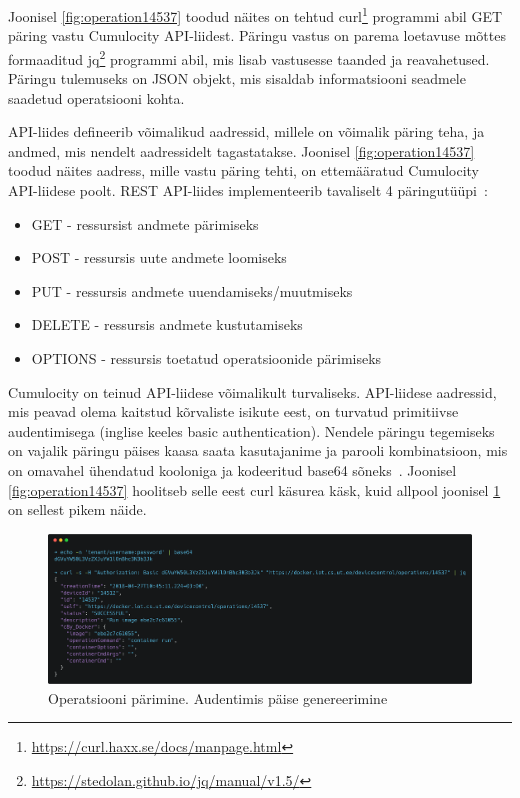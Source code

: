 \documentclass[12pt]{article}
\begin{document}
  \FloatBarrier

  Joonisel \ref{fig:operation14537} toodud näites on tehtud curl\footnote{\url{https://curl.haxx.se/docs/manpage.html}}
  programmi abil GET päring vastu Cumulocity API-liidest.
  Päringu vastus on parema loetavuse mõttes formaaditud jq\footnote{\url{https://stedolan.github.io/jq/manual/v1.5/}}
  programmi abil, mis lisab vastusesse
  taanded ja reavahetused. Päringu tulemuseks on JSON objekt, mis sisaldab informatsiooni seadmele saadetud
  operatsiooni kohta.

  API-liides defineerib võimalikud aadressid, millele on võimalik päring teha, ja andmed, mis nendelt aadressidelt
  tagastatakse. Joonisel \ref{fig:operation14537} toodud näites aadress, mille vastu päring tehti,
  on ettemääratud Cumulocity API-liidese poolt. REST API-liides implementeerib tavaliselt 4
  päringutüüpi~\cite{REST}:

  \begin{itemize}
    \item GET - ressursist andmete pärimiseks
    \item POST - ressursis uute andmete loomiseks
    \item PUT - ressursis andmete uuendamiseks/muutmiseks
    \item DELETE - ressursis andmete kustutamiseks
    \item OPTIONS - ressursis toetatud operatsioonide pärimiseks
  \end{itemize}

  Cumulocity on teinud API-liidese võimalikult turvaliseks. API-liidese aadressid, mis peavad olema kaitstud
  kõrvaliste isikute eest, on turvatud primitiivse audentimisega (inglise keeles basic authentication). Nendele
  päringu tegemiseks on vajalik päringu päises kaasa saata kasutajanime ja parooli kombinatsioon, mis on
  omavahel ühendatud kooloniga ja kodeeritud base64 sõneks~\cite{cumulocityRestDocumentation}.
  Joonisel \ref{fig:operation14537} hoolitseb
  selle eest curl käsurea käsk, kuid allpool joonisel \ref{fig:operation14537base64} on sellest pikem näide.

  \begin{figure} [ht] %
  \begin{center}
  \includegraphics[width=1\textwidth]{operation14537base64}
  \caption{Operatsiooni pärimine. Audentimis päise genereerimine}
  \label{fig:operation14537base64}
  \end{center}
  \end{figure}
\end{document}

